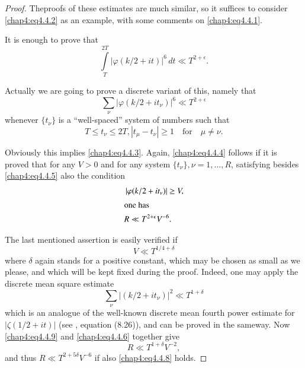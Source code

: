 \begin{proof}
The\pageoriginale proofs of these estimates are much similar, so it
suffices to consider \eqref{chap4:eq4.4.2} as an example, with some
comments on \eqref{chap4:eq4.4.1}. 

It is enough to prove that 
\begin{equation}\label{chap4:eq4.4.3}
\int\limits_T^{2T}\left|\varphi(k /2+it)\right|^6\,dt\ll T^{2+\epsilon}.
\end{equation}

Actually we are going to prove a discrete variant of this, namely that 
\begin{equation}\label{chap4:eq4.4.4}
\sum\limits_\nu\left|\varphi(k /2+it_\nu)\right|^6 \ll T^{2+\epsilon}
\end{equation}
whenever $\{t_\nu\}$ is a ``well-spaced'' system of numbers such that 
\begin{equation}\label{chap4:eq4.4.5}
T\leq t_\nu \leq 2T, \left|t_\mu-t_\nu\right|\geq 1\quad\text{for}\quad\mu\neq\nu.
\end{equation}

Obviously this implies \eqref{chap4:eq4.4.3}. Again, \eqref{chap4:eq4.4.4} follows if it is proved that for any $V>0$ and for any system $\{t_\nu\},\nu=1, \ldots,R$, satisfying besides \eqref{chap4:eq4.4.5} also the condition
\begin{align}
& \left|\varphi(k /2+it_\nu)\right|\geq V,\label{chap4:eq4.4.6}\\
\intertext{one has}
& R\ll T^{2+\epsilon}V^{-6}.\label{chap4:eq4.4.7}
\end{align}

The last mentioned assertion is easily verified if 
\begin{equation}\label{chap4:eq4.4.8}
V\ll T^{1/4+\delta}
\end{equation}
where $\delta$ again stands for a positive constant, which may be chosen as small as we please, and which will be kept fixed during the proof. Indeed, one may apply the discrete mean square estimate
\begin{equation}\label{chap4:eq4.4.9}
\sum\limits_\nu\left|(k /2+it_\nu)\right|^2\ll T^{1+\delta}
\end{equation}
which is an analogue of the well-known discrete mean fourth power estimate for $|\zeta(1/2+it)|$ (see \cite{key13}, equation (8.26)), and can be proved in the same\pageoriginale way. Now \eqref{chap4:eq4.4.9} and \eqref{chap4:eq4.4.6} together give 
\begin{equation}\label{chap4:eq4.4.10}
R\ll T^{1+\delta}V^{-2},
\end{equation}
and thus $R\ll T^{2+5\delta}V^{-6}$ if also \eqref{chap4:eq4.4.8} holds.


\end{proof}
